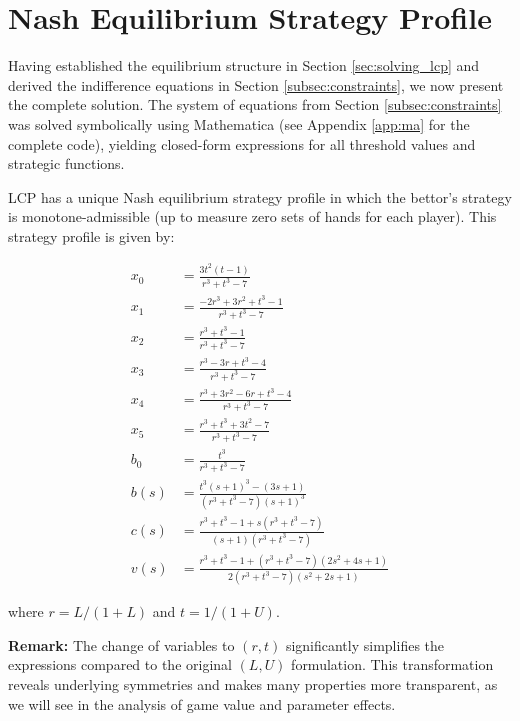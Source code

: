 \documentclass[../../main/main.tex]{subfiles}
\begin{document}
\section{Nash Equilibrium Strategy Profile}

Having established the equilibrium structure in Section \ref{sec:solving_lcp} and derived the indifference equations in Section \ref{subsec:constraints}, we now present the complete solution. The system of equations from Section \ref{subsec:constraints} was solved symbolically using Mathematica (see Appendix \ref{app:ma} for the complete code), yielding closed-form expressions for all threshold values and strategic functions.

\begin{theorem}
    \label{thm:nash_equilibrium}
LCP has a unique Nash equilibrium strategy profile in which the bettor's strategy is monotone-admissible (up to measure zero sets of hands for each player). This strategy profile is given by:

\begin{align*}
    x_{0} &= \frac{3 t^{2} \left(t - 1\right)}{r^{3} + t^{3} - 7}\\
    x_{1} &= \frac{- 2 r^{3} + 3 r^{2} + t^{3} - 1}{r^{3} + t^{3} - 7}\\
    x_{2} &= \frac{r^{3} + t^{3} - 1}{r^{3} + t^{3} - 7}\\
    x_{3} &= \frac{r^{3} - 3 r + t^{3} - 4}{r^{3} + t^{3} - 7}\\
    x_{4} &= \frac{r^{3} + 3 r^{2} - 6 r + t^{3} - 4}{r^{3} + t^{3} - 7}\\
    x_{5} &= \frac{r^{3} + t^{3} + 3 t^{2} - 7}{r^{3} + t^{3} - 7}\\
    b_{0} &= \frac{t^{3}}{r^{3} + t^{3} - 7}\\
    b(s) &= \frac{t^{3} \left(s+1\right)^3 - (3s + 1)}{\left(r^{3} + t^{3} - 7\right) \left(s+1\right)^3}\\
    c(s) &= \frac{r^{3} + t^3 -1 + s \left(r^{3} + t^{3} - 7\right)}{\left(s + 1\right) \left(r^{3} + t^{3} - 7\right)}\\
    v(s) &= \frac{r^{3} + t^{3} -1 + \left(r^{3} + t^{3} - 7\right) \left(2 s^{2} + 4 s + 1\right)}{2 \left(r^{3} + t^{3} - 7\right) \left(s^{2} + 2 s + 1\right)}
\end{align*}

where $r = L/(1+L)$ and $t = 1/(1+U)$.

\noindent\textbf{Remark:} The change of variables to $(r, t)$ significantly simplifies the expressions compared to the original $(L, U)$ formulation. This transformation reveals underlying symmetries and makes many properties more transparent, as we will see in the analysis of game value and parameter effects.


\end{theorem}
\end{document}
